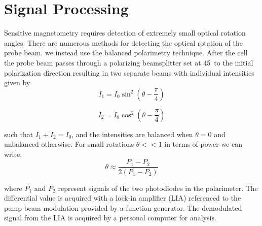 \section{Signal Processing\label{sec:Signal Processing}}
Sensitive magnetometry requires detection of extremely small optical rotation angles. There are numerous methods for detecting the optical rotation of the probe beam.  we instead use the balanced polarimetry technique.  After the cell the probe beam passes through a polarizing beamsplitter set at 45\degree~to the initial polarization direction resulting in two separate beams with individual intensities given by 
\begin{equation}
I_1 = I_0\sin^2(\theta-\frac{\pi}{4})
\end{equation}

\begin{equation}
I_2 = I_0 \cos^2(\theta-\frac{\pi}{4})   
\end{equation}

such that $I_1 + I_2 = I_0$, and the intensities are balanced when $\theta = 0$ and unbalanced otherwise. 
For small rotations $\theta << 1$ in terms of power we can write,
\begin{equation}
  \theta \approx \frac{P_1-P_2}{2(P_1-P_2)}  
\end{equation}

where $P_1$ and $P_2$ represent signals of the two photodiodes in the polarimeter. The differential value is acquired with a lock-in amplifier (LIA) referenced to the pump beam modulation provided by a function generator. The demodulated signal from the LIA is acquired by a personal computer for analysis. 

